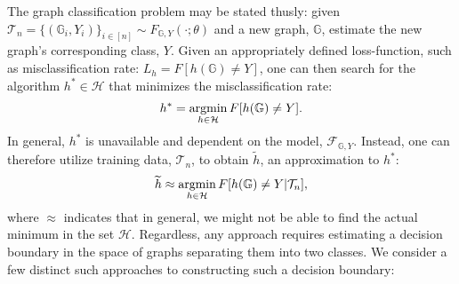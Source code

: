 \documentclass{article} %
\newcommand{\argmin}{\operatornamewithlimits{argmin}}
\providecommand{\mc}[1]{\mathcal{#1}}
\providecommand{\mt}[1]{\widetilde{#1}}
\newcommand{\GG}{\mathbb{G}}
\begin{document}
The graph classification problem may be stated thusly: given $\mc{T}_n=\{(\GG_i,Y_i)\}_{i \in [n]} \sim F_{\GG,Y}(\cdot; \theta)$ and a new graph, $\GG$, estimate the new graph's corresponding class, $Y$.  Given an appropriately defined loss-function, such as misclassification rate: $L_h=F[h(\GG) \neq Y]$, one can then search for the algorithm $h^* \in \mc{H}$ that minimizes the misclassification rate:
\begin{align}
	h^* = \argmin_{h \in \mc{H}} F[h(\GG) \neq Y].
\end{align}
In general, $h^*$ is unavailable and dependent on the model, $\mc{F}_{\GG,Y}$.  Instead, one can therefore utilize training data, $\mc{T}_n$, to obtain $\mt{h}$, an approximation to $h^*$:
\begin{align}
	\mt{h} \approx \argmin_{h \in \mc{H}} F[h(\GG) \neq Y | \mc{T}_n],
\end{align}
where $\approx$ indicates that in general, we might not be able to find the actual minimum in the set $\mc{H}$. Regardless, any approach requires estimating a decision boundary in the space of graphs separating them into two classes.  We consider a few distinct such approaches to constructing such a decision boundary:


\end{document}
